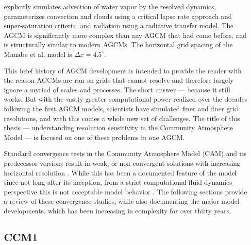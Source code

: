 \cite{METAL1965MWR} explicitly simulates advection of water vapor by the resolved dynamics, parameterizes convection and clouds using a critical lapse rate approach and super-saturation criteria, and radiation using a radiative transfer model. The \cite{METAL1965MWR} AGCM is significantly more complex than any AGCM that had come before, and is structurally similar to modern AGCMs. The horizontal grid spacing of the Manabe et al. model is $\Delta x = 4.5^{\circ}$.

This brief history of AGCM development is intended to provide the reader with the reason AGCMs are ran on grids that cannot resolve and therefore largely ignore a myriad of scales and processes. The short answer --- because it still works. But with the vastly greater computational power realized over the decades following the first AGCM models, scientists have simulated finer and finer grid resolutions, and with this comes a whole new set of challenges. The title of this thesis --- understanding resolution sensitivity in the Community Atmosphere Model --- is focused on one of these problems in one AGCM. 

Standard convergence tests in the Community Atmosphere Model (CAM) and its predecessor versions result in weak, or non-convergent solutions with increasing horizontal resolution \citep{KW1991JGR,WETAL1995CD,W1999T,W2008TELLUS,LETAL2011TELLUS,RJ2011MWR,RETAL2012ASL,OETAL2013JCLIM,RETAL2013JCLIM,ZetAl2014JCb,LETAL2015JCLIM}. While this has been a documented feature of the model since not long after its inception, from a strict computational fluid dynamics perspective this is not acceptable model behavior \citep{W2008TELLUS}. The following sections provide a review of these convergence studies, while also documenting the major model developments, which has been increasing in complexity for over thirty years.

\subsection{CCM1}

